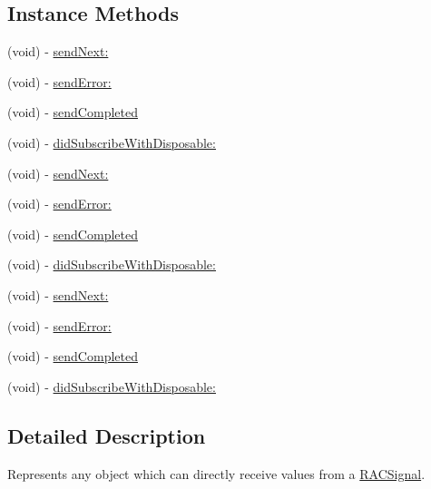 \subsection*{Instance Methods}
\begin{DoxyCompactItemize}
\item 
(void) -\/ \mbox{\hyperlink{protocol_r_a_c_subscriber_01-p_ac5b675c8be8a83f8e7b7d96301cd6656}{send\+Next\+:}}
\item 
(void) -\/ \mbox{\hyperlink{protocol_r_a_c_subscriber_01-p_a70712a2213c3b1ac2d06b3634e924974}{send\+Error\+:}}
\item 
(void) -\/ \mbox{\hyperlink{protocol_r_a_c_subscriber_01-p_a5dafeaf878cebf8834fc7b8039550a43}{send\+Completed}}
\item 
(void) -\/ \mbox{\hyperlink{protocol_r_a_c_subscriber_01-p_a44012a5efac0242765bfb0a98180654d}{did\+Subscribe\+With\+Disposable\+:}}
\item 
(void) -\/ \mbox{\hyperlink{protocol_r_a_c_subscriber_01-p_ac5b675c8be8a83f8e7b7d96301cd6656}{send\+Next\+:}}
\item 
(void) -\/ \mbox{\hyperlink{protocol_r_a_c_subscriber_01-p_a70712a2213c3b1ac2d06b3634e924974}{send\+Error\+:}}
\item 
(void) -\/ \mbox{\hyperlink{protocol_r_a_c_subscriber_01-p_a5dafeaf878cebf8834fc7b8039550a43}{send\+Completed}}
\item 
(void) -\/ \mbox{\hyperlink{protocol_r_a_c_subscriber_01-p_a44012a5efac0242765bfb0a98180654d}{did\+Subscribe\+With\+Disposable\+:}}
\item 
(void) -\/ \mbox{\hyperlink{protocol_r_a_c_subscriber_01-p_ac5b675c8be8a83f8e7b7d96301cd6656}{send\+Next\+:}}
\item 
(void) -\/ \mbox{\hyperlink{protocol_r_a_c_subscriber_01-p_a70712a2213c3b1ac2d06b3634e924974}{send\+Error\+:}}
\item 
(void) -\/ \mbox{\hyperlink{protocol_r_a_c_subscriber_01-p_a5dafeaf878cebf8834fc7b8039550a43}{send\+Completed}}
\item 
(void) -\/ \mbox{\hyperlink{protocol_r_a_c_subscriber_01-p_a44012a5efac0242765bfb0a98180654d}{did\+Subscribe\+With\+Disposable\+:}}
\end{DoxyCompactItemize}


\subsection{Detailed Description}
Represents any object which can directly receive values from a \mbox{\hyperlink{interface_r_a_c_signal}{R\+A\+C\+Signal}}.

